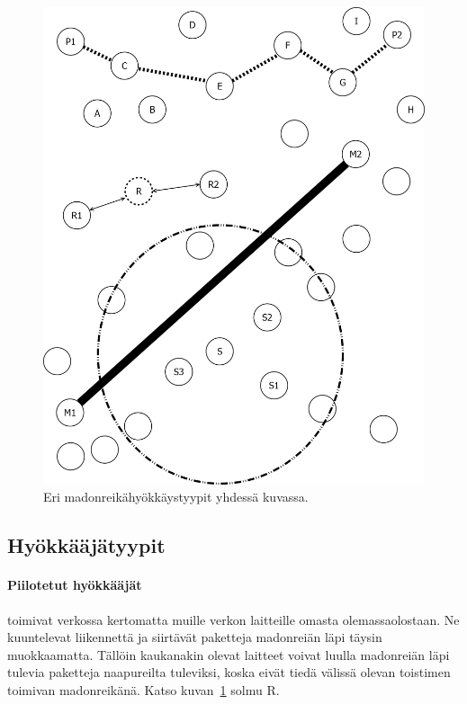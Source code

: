 \documentclass[finnish]{tktltiki2}
\theoremstyle{definition}
\theoremstyle{remark}
\begin{document}
\begin{figure}[!ht]
  \centering
  \includegraphics[width=\linewidth]{attacks}
  \caption{Eri madonreikähyökkäystyypit yhdessä kuvassa.}
  \label{fig:attacker-types}
\end{figure}

\subsection{Hyökkääjätyypit}
\paragraph{Piilotetut hyökkääjät} toimivat verkossa kertomatta muille verkon laitteille omasta olemassaolostaan. Ne kuuntelevat liikennettä ja siirtävät paketteja madonreiän läpi täysin muokkaamatta. Tällöin kaukanakin olevat laitteet voivat luulla madonreiän läpi tulevia paketteja naapureilta tuleviksi, koska eivät tiedä välissä olevan toistimen toimivan madonreikänä. Katso kuvan~\ref{fig:attacker-types} solmu R.
\end{document}
